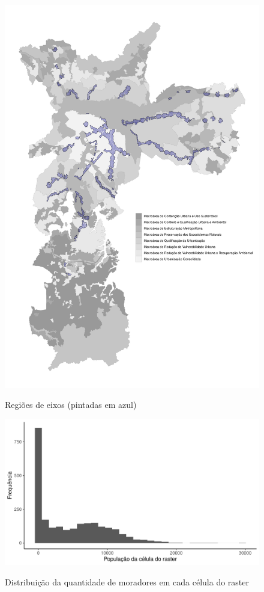 \begin{apendicesenv}
\begin{figure}[!h]
    \centering
    \caption{Regiões de eixos (pintadas em azul)}
    \includegraphics[width = .85\linewidth]{figuras/macroareas-eixos.pdf}
    \label{fig:eixos}
\end{figure}

\clearpage

\begin{figure}[!h]
    \centering
    \caption{Distribuição da quantidade de moradores em cada célula do raster}
    \includegraphics[width = .85\linewidth]{figuras/populacao-distribuicao-raster.pdf}
    \label{fig:populacao-rasters}
\end{figure}


\end{apendicesenv}
